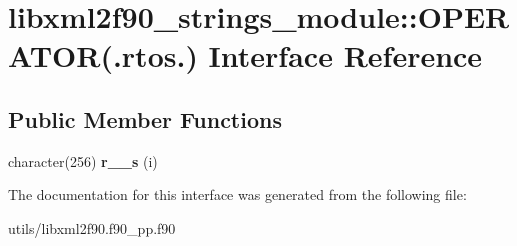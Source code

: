 \hypertarget{interfacelibxml2f90__strings__module_1_1OPERATOR_07_8rtos_8_08}{
\section{libxml2f90\_\-strings\_\-module::OPERATOR(.rtos.) Interface Reference}
\label{interfacelibxml2f90__strings__module_1_1OPERATOR_07_8rtos_8_08}
}
\subsection*{Public Member Functions}
\begin{DoxyCompactItemize}
\item 
\hypertarget{interfacelibxml2f90__strings__module_1_1OPERATOR_07_8rtos_8_08_aa42ea4271d8899fce5cd28751aaa3546}{
character(256) {\bfseries r\_\_\-s} (i)}
\label{interfacelibxml2f90__strings__module_1_1OPERATOR_07_8rtos_8_08_aa42ea4271d8899fce5cd28751aaa3546}

\end{DoxyCompactItemize}


The documentation for this interface was generated from the following file:\begin{DoxyCompactItemize}
\item 
utils/libxml2f90.f90\_\-pp.f90\end{DoxyCompactItemize}
